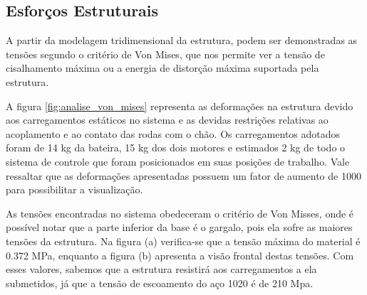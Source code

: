  \subsection{Esforços Estruturais}

 A partir da modelagem tridimensional da estrutura, podem ser demonstradas as tensões segundo o critério de Von Mises, que nos permite ver a tensão de cisalhamento máxima ou a energia de distorção máxima suportada pela estrutura.

 A figura \ref{fig:analise_von_mises} representa as deformações na estrutura devido aos carregamentos estáticos no sistema e as devidas restrições relativas ao acoplamento e ao contato das rodas com o chão. Os carregamentos adotados foram de 14 kg da bateira, 15 kg dos dois motores e estimados 2 kg de todo o sistema de controle que foram posicionados em suas posições de trabalho. Vale ressaltar que as deformações apresentadas possuem um fator de aumento de 1000 para possibilitar a visualização.

 As tensões encontradas no sistema obedeceram o critério de Von Misses, onde é possível notar que a parte inferior da base é o gargalo, pois ela sofre as maiores tensões da estrutura. Na figura (a) verifica-se que a tensão máxima do material é 0.372 MPa, enquanto a figura (b) apresenta a visão frontal destas tensões. Com esses valores, sabemos que a estrutura resistirá aos carregamentos a ela submetidos, já que a tensão de escoamento do aço 1020 é de 210 Mpa.

